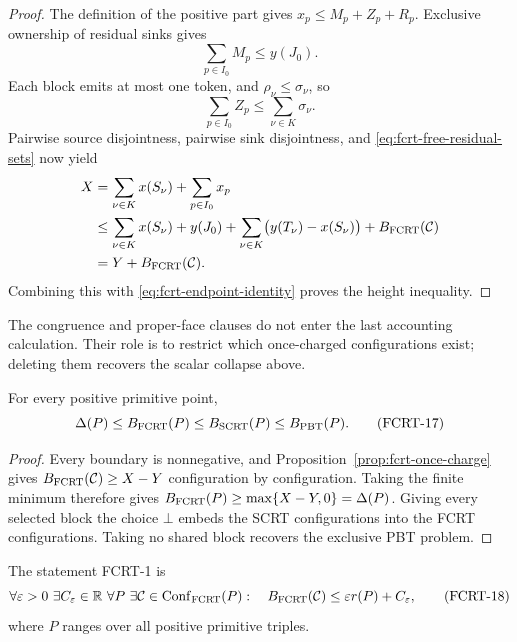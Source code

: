 \begin{proof}
The definition of the positive part gives
$x_p\le M_p+Z_p+R_p$.  Exclusive ownership of residual sinks gives
\[
                       \sum_{p\in I_0}M_p\le y(J_0).
\]
Each block emits at most one token, and
$\rho_\nu\le\sigma_\nu$, so
\[
                       \sum_{p\in I_0}Z_p
                       \le\sum_{\nu\in K}\sigma_\nu.
\]
Pairwise source disjointness, pairwise sink disjointness, and
\eqref{eq:fcrt-free-residual-sets} now yield
\[
 \begin{aligned}
 X
 &=\sum_{\nu\in K}x(S_\nu)+\sum_{p\in I_0}x_p\\
 &\le\sum_{\nu\in K}x(S_\nu)+y(J_0)
       +\sum_{\nu\in K}\bigl(y(T_\nu)-x(S_\nu)\bigr)
       +B_{\rm FCRT}(\mathcal C)\\
 &=Y+B_{\rm FCRT}(\mathcal C).
 \end{aligned}
\]
Combining this with \eqref{eq:fcrt-endpoint-identity} proves the height
inequality.
\end{proof}

The congruence and proper-face clauses do not enter the last accounting
calculation.  Their role is to restrict which once-charged configurations
exist; deleting them recovers the scalar collapse above.

\begin{corollary}
\label{cor:fcrt-sandwich}
For every positive primitive point,
\[
 \Delta(P)\le B_{\rm FCRT}(P)
             \le B_{\rm SCRT}(P)\le B_{\rm PBT}(P).
\tag{FCRT-17}\label{eq:fcrt-sandwich}
\]
\end{corollary}

\begin{proof}
Every boundary is nonnegative, and
Proposition~\ref{prop:fcrt-once-charge} gives
$B_{\rm FCRT}(\mathcal C)\ge X-Y$ configuration by configuration.  Taking
the finite minimum therefore gives
$B_{\rm FCRT}(P)\ge\max\{X-Y,0\}=\Delta(P)$.  Giving every selected block
the choice $\bot$ embeds the SCRT configurations into the FCRT
configurations.  Taking no shared block recovers the exclusive PBT problem.
\end{proof}

\begin{definition}
\label{def:fcrt-uniform-gate}
The statement \textup{FCRT-1} is
\[
 \forall\varepsilon>0\ \exists C_\varepsilon\in\mathbb R\
 \forall P\ \exists\mathcal C\in\operatorname{Conf}_{\rm FCRT}(P):
 \quad B_{\rm FCRT}(\mathcal C)
 \le\varepsilon r(P)+C_\varepsilon,
\tag{FCRT-18}\label{eq:fcrt-uniform-gate}
\]
where $P$ ranges over all positive primitive triples.
\end{definition}

